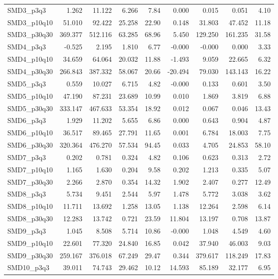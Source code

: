 \begin{longtable}{lrrrrrrrr}
SMD3\_p3q3 & 1.262 & 11.122 & 6.266 & 7.84 & 0.000 & 0.015 & 0.051 & 4.10 \\
SMD3\_p10q10 & 51.010 & 92.422 & 25.258 & 22.90 & 0.148 & 31.803 & 47.452 & 11.18 \\
SMD3\_p30q30 & 369.377 & 512.116 & 63.285 & 68.96 & 5.450 & 129.250 & 161.235 & 31.58 \\
SMD4\_p3q3 & -0.525 & 2.195 & 1.810 & 6.77 & -0.000 & -0.000 & 0.000 & 3.33 \\
SMD4\_p10q10 & 34.659 & 64.064 & 20.032 & 11.88 & -1.493 & 9.059 & 22.665 & 6.32 \\
SMD4\_p30q30 & 266.843 & 387.332 & 58.067 & 20.66 & -20.494 & 79.030 & 143.143 & 16.22 \\
SMD5\_p3q3 & 0.559 & 10.027 & 6.715 & 4.82 & -0.000 & 0.133 & 0.601 & 3.50 \\
SMD5\_p10q10 & 47.190 & 87.231 & 23.689 & 10.99 & 0.010 & 1.869 & 3.819 & 6.88 \\
SMD5\_p30q30 & 333.147 & 467.633 & 53.354 & 18.92 & 0.012 & 0.067 & 0.046 & 13.43 \\
SMD6\_p3q3 & 1.929 & 11.202 & 5.655 & 6.86 & 0.000 & 0.643 & 0.904 & 4.87 \\
SMD6\_p10q10 & 36.517 & 89.465 & 27.791 & 11.65 & 0.001 & 6.784 & 18.003 & 7.75 \\
SMD6\_p30q30 & 320.364 & 476.270 & 57.534 & 94.45 & 0.033 & 4.705 & 24.853 & 58.10 \\
SMD7\_p3q3 & 0.202 & 0.781 & 0.324 & 4.82 & 0.106 & 0.623 & 0.313 & 2.72 \\
SMD7\_p10q10 & 1.165 & 1.630 & 0.204 & 9.58 & 0.202 & 1.213 & 0.335 & 5.07 \\
SMD7\_p30q30 & 2.266 & 2.870 & 0.354 & 14.32 & 1.902 & 2.407 & 0.277 & 12.49 \\
SMD8\_p3q3 & 5.734 & 9.451 & 2.544 & 5.97 & 1.478 & 5.772 & 3.038 & 3.62 \\
SMD8\_p10q10 & 11.711 & 13.692 & 1.258 & 13.05 & 1.138 & 12.264 & 2.598 & 6.14 \\
SMD8\_p30q30 & 12.283 & 13.742 & 0.721 & 23.59 & 11.804 & 13.197 & 0.708 & 13.87 \\
SMD9\_p3q3 & 1.045 & 8.508 & 5.714 & 10.86 & -0.000 & 1.048 & 4.549 & 4.60 \\
SMD9\_p10q10 & 22.601 & 77.320 & 24.840 & 16.85 & 0.042 & 37.940 & 46.003 & 9.03 \\
SMD9\_p30q30 & 259.167 & 376.018 & 67.249 & 29.47 & 0.344 & 379.617 & 118.249 & 17.83 \\
SMD10\_p3q3 & 39.011 & 74.743 & 29.462 & 10.12 & 14.593 & 85.189 & 32.177 & 6.95 \\

\end{longtable}
